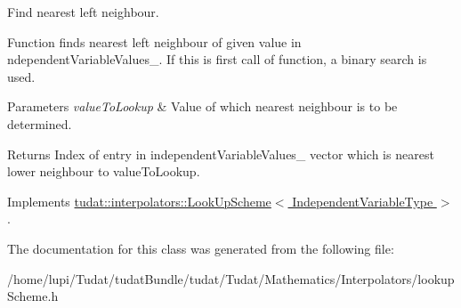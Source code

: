 Find nearest left neighbour. 

Function finds nearest left neighbour of given value in ndependent\+Variable\+Values\+\_\+. If this is first call of function, a binary search is used. 
\begin{DoxyParams}{Parameters}
{\em value\+To\+Lookup} & Value of which nearest neighbour is to be determined. \\
\hline
\end{DoxyParams}
\begin{DoxyReturn}{Returns}
Index of entry in independent\+Variable\+Values\+\_\+ vector which is nearest lower neighbour to value\+To\+Lookup. 
\end{DoxyReturn}


Implements \hyperlink{classtudat_1_1interpolators_1_1LookUpScheme_a7749ee1bb2df25690a6e040a3e61f646}{tudat\+::interpolators\+::\+Look\+Up\+Scheme$<$ Independent\+Variable\+Type $>$}.



The documentation for this class was generated from the following file\+:\begin{DoxyCompactItemize}
\item 
/home/lupi/\+Tudat/tudat\+Bundle/tudat/\+Tudat/\+Mathematics/\+Interpolators/lookup\+Scheme.\+h\end{DoxyCompactItemize}
